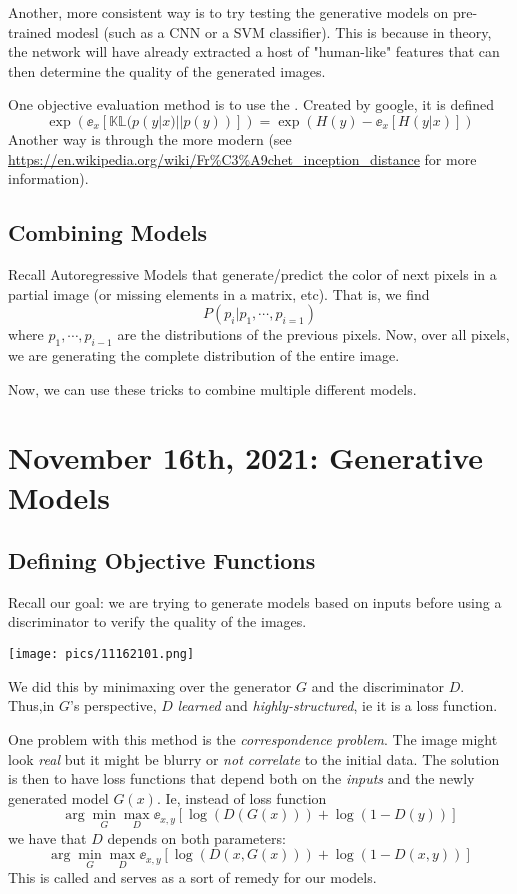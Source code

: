 \documentclass[11pt]{scrartcl}
\begin{document}
Another, more consistent way is to try testing the generative models on pre-trained modesl (such as a CNN or a SVM classifier). This is because in theory, the network will have already extracted a host of "human-like" features that can then determine the quality of the generated images. 

One objective evaluation method is to use the . Created by google, it is defined $$\exp\left(\ee_{x}\left[\mathbb{K}\mathbb{L}(p(y|x) || p(y))\right]\right) = \exp\left(H(y)-\ee_{x}\left[H(y|x)\right]\right)$$
Another way is through the more modern  (see \url{https://en.wikipedia.org/wiki/Fr\%C3\%A9chet_inception_distance} for more information). 

\subsection{Combining Models}
Recall Autoregressive Models that generate/predict the color of next pixels in a partial image (or missing elements in a matrix, etc). That is, we find $$P(p_i|p_1,\cdots,p_{i=1})$$ where $p_1,\cdots,p_{i-1}$ are the distributions of the previous pixels. Now, over all pixels, we are generating the complete distribution of the entire image. 

Now, we can use these tricks to combine multiple different models.

\newpage

\section{November 16th, 2021: Generative Models}

\subsection{Defining Objective Functions}

Recall our goal: we are trying to generate models based on inputs before using a discriminator to verify the quality of the images. 
\begin{center}
    \texttt{[image: pics/11162101.png]}
\end{center}

We did this by minimaxing over the generator $G$ and the discriminator $D$. Thus,in $G$'s perspective, $D$ \textit{learned} and \textit{highly-structured}, ie it is a loss function. 

One problem with this method is the \textit{correspondence problem}. The image might look \textit{real} but it might be blurry or \textit{not correlate} to the initial data. The solution is then to have loss functions that depend both on the \textit{inputs} and the newly generated model $G(x)$. Ie, instead of loss function
$$\arg\min_{G}\max_{D} \ee_{x,y}\left[\log(D(G(x)))+\log(1-D(y))\right]$$
we have that $D$ depends on both parameters:
$$\arg\min_{G}\max_{D} \ee_{x,y}\left[\log(D(x,G(x)))+\log(1-D(x,y))\right]$$
This is called  and serves as a sort of remedy for our models. 
\end{document}

